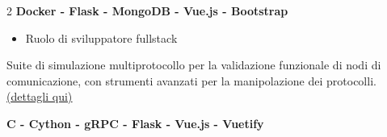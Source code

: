 \documentclass[10pt,a4paper,ragged2e,withhyper]{altacv}
\begin{document}
\begin{paracol}{2}
\textbf{\small Docker - Flask - MongoDB - Vue.js - Bootstrap}

\divider

\begin{itemize}
    \item Ruolo di sviluppatore fullstack
\end{itemize}
Suite di simulazione multiprotocollo per la validazione funzionale di nodi di comunicazione, con strumenti avanzati per la manipolazione dei protocolli. \href{https://www.niering.it/case_histories/simulatore-multiprotocollo-emuxp/}{(\underline{dettagli qui)}}

\textbf{\small C - Cython - gRPC - Flask - Vue.js - Vuetify}







\\

\divider\smallskip

\\
\\
\\
\\
\\


\divider\smallskip

\\

\divider
{}




\medskip


\end{paracol}
\end{document}
